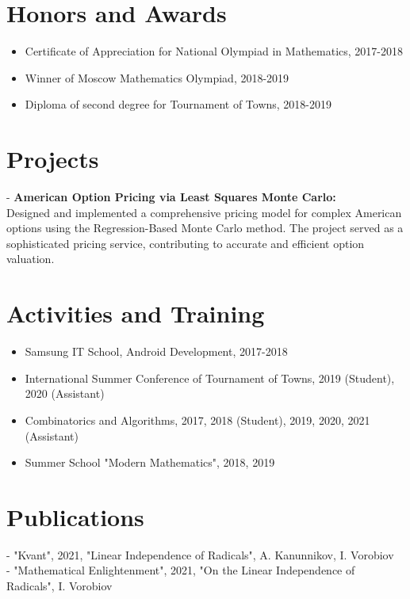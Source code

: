 \documentclass[a4paper,10pt]{article}
\begin{document}
    \section*{Honors and Awards}
    \begin{itemize}
        \item Certificate of Appreciation for National Olympiad in Mathematics, 2017-2018
        \item Winner of Moscow Mathematics Olympiad, 2018-2019
        \item Diploma of second degree for Tournament of Towns, 2018-2019
    \end{itemize}

    \section*{Projects}
    - \textbf{American Option Pricing via Least Squares Monte Carlo:}\\
    Designed and implemented a comprehensive pricing model for complex American options using the Regression-Based Monte Carlo method. The project served as a sophisticated pricing service, contributing to accurate and efficient option valuation.


    \section*{Activities and Training}
    \begin{itemize}
        \item Samsung IT School, Android Development, 2017-2018
        \item International Summer Conference of Tournament of Towns, 2019 (Student), 2020 (Assistant)
        \item Combinatorics and Algorithms, 2017, 2018 (Student), 2019, 2020, 2021 (Assistant)
        \item Summer School "Modern Mathematics", 2018, 2019
    \end{itemize}

    \section*{Publications}
    - "Kvant", 2021, "Linear Independence of Radicals", A. Kanunnikov, I. Vorobiov\\
    - "Mathematical Enlightenment", 2021, "On the Linear Independence of Radicals", I. Vorobiov
\end{document}
